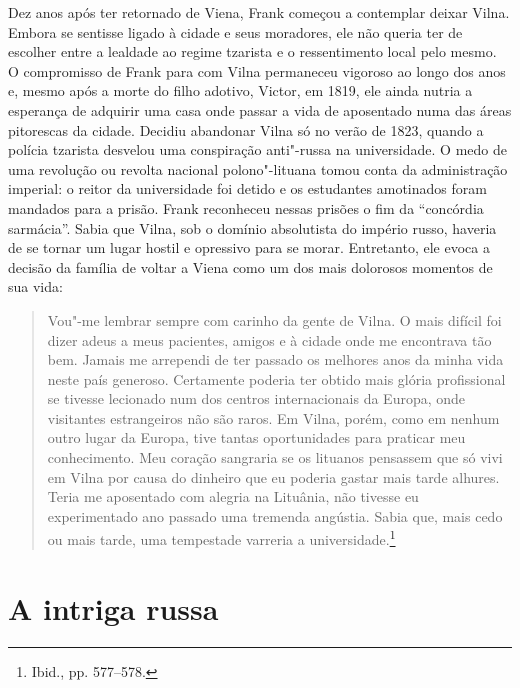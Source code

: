 Dez anos após ter retornado de Viena, Frank começou a contemplar deixar
Vilna. Embora se sentisse ligado à cidade e seus moradores, ele não
queria ter de escolher entre a lealdade ao regime tzarista e o
ressentimento local pelo mesmo. O compromisso de Frank para com Vilna
permaneceu vigoroso ao longo dos anos e, mesmo após a morte do filho
adotivo, Victor, em 1819, ele ainda nutria a esperança de adquirir uma
casa onde passar a vida de aposentado numa das áreas pitorescas da
cidade. Decidiu abandonar Vilna só no verão de 1823, quando a polícia
tzarista desvelou uma conspiração anti"-russa na universidade. O medo de
uma revolução ou revolta nacional polono"-lituana tomou conta da
administração imperial: o reitor da universidade foi detido e os
estudantes amotinados foram mandados para a prisão. Frank reconheceu
nessas prisões o fim da ``concórdia sarmácia''. Sabia que Vilna, sob o
domínio absolutista do império russo, haveria de se tornar um lugar
hostil e opressivo para se morar. Entretanto, ele evoca a decisão da
família de voltar a Viena como um dos mais dolorosos momentos de sua
vida:

\begin{quote}
Vou"-me lembrar sempre com carinho da gente de Vilna. O mais difícil foi
dizer adeus a meus pacientes, amigos e à cidade onde me encontrava tão
bem. Jamais me arrependi de ter passado os melhores anos da minha vida
neste país generoso. Certamente poderia ter obtido mais glória
profissional se tivesse lecionado num dos centros internacionais da
Europa, onde visitantes estrangeiros não são raros. Em Vilna, porém,
como em nenhum outro lugar da Europa, tive tantas oportunidades para
praticar meu conhecimento. Meu coração sangraria se os lituanos
pensassem que só vivi em Vilna por causa do dinheiro que eu poderia
gastar mais tarde alhures. Teria me aposentado com alegria na Lituânia, 
não tivesse eu experimentado ano passado uma tremenda angústia. Sabia
que, mais cedo ou mais tarde, uma tempestade varreria a
universidade.\footnote{Ibid., pp. 577--578.}
\end{quote}

\chapter{A intriga russa}

\begin{epigraphs} 
\end{epigraphs}


